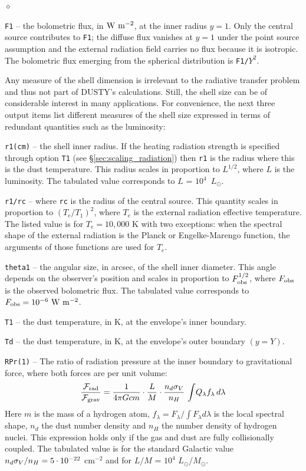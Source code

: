 \documentclass[11pt]{article}
\def\D    {{\sf DUSTY}}
\def\E#1{\hbox{$10^{#1}$}}
\def\eq#1{\begin{equation} #1 \end{equation}}
\def\Mo     {\hbox{$M_{\odot}$}}
\def\Lo     {\hbox{$L_{\odot}$}}
\def\sub#1{_{\rm #1}}
\def\Frad {\hbox{${\cal F}\sub{rad}$}}
\def\Fgrav{\hbox{${\cal F}\sub{grav}$}}
\begin{document}
\begin{list}{$\diamond$}{}
\item {\tt F1} -- the bolometric flux, in $\rm W\ m^{-2}$, at the inner radius
    $y = 1$. Only the central source contributes to {\tt F1}; the diffuse flux
    vanishes at $y = 1$ under the point source assumption and the external
    radiation field carries no flux because it is isotropic. The bolometric
    flux emerging from the spherical distribution is {\tt F1/$Y^2$}.

  Any measure of the shell dimension is irrelevant to the radiative
  transfer problem and thus not part of \D's calculations.  Still, the
  shell size can be of considerable interest in many applications. For
  convenience, the next three output items list different measures of
  the shell size expressed in terms of redundant quantities such as
  the luminosity:

\item {\tt r1(cm)} -- the shell inner radius. If the heating radiation
    strength is specified through option {\tt T1} (see
    \S\ref{sec:scaling_radiation}) then {\tt r1} is the radius where this is
    the dust temperature. This radius scales in proportion to $L^{1/2}$, where
    $L$ is the luminosity. The tabulated value corresponds to $L$ = \E4~\Lo.

\item {\tt r1/rc} -- where {\tt rc} is the radius of the central
  source.  This quantity scales in proportion to $(T_e/T_1)^2$, where
  $T_e$ is the external radiation effective temperature.  The listed
  value is for $T_e = 10,000$ K with two exceptions: when the spectral
  shape of the external radiation is the Planck or Engelke-Marengo
  function, the arguments of those functions are used for $T_e$.

\item {\tt theta1} -- the angular size, in arcsec, of the shell inner
  diameter.  This angle depends on the observer's position and scales
  in proportion to $F_{\rm obs}^{1/2}$, where $F_{\rm obs}$ is the
  observed bolometric flux.  The tabulated value corresponds to
  $F_{\rm obs} = \E{-6}\ \rm W\ m^{-2}$.

\item {\tt T1} -- the dust temperature, in K, at the envelope's
  inner boundary.

\item {\tt Td} -- the dust temperature, in K, at the envelope's
  outer boundary $(y = Y)$.

\item {\tt RPr(1)} -- The ratio of radiation pressure at the inner
  boundary to gravitational force, where both forces are per unit
  volume: \eq{ {\Frad\over\Fgrav} = {1\over4\pi Gcm} \cdot{L\over
      M}\cdot{n_d\sigma_V\over n_H}\, \int\!Q_\lambda
    f_\lambda\,d\lambda } Here $m$ is the mass of a hydrogen atom,
  $f_\lambda = F_\lambda/\int F_\lambda d\lambda$ is the local
  spectral shape, $n_d$ the dust number density and $n_H$ the number
  density of hydrogen nuclei.  This expression holds only if the gas
  and dust are fully collisionally coupled. The tabulated value is for
  the standard Galactic value $n_d\sigma_V/n_H = 5\cdot\E{-22}$
  cm$^{-2}$ and for $L/M$ = \E4 \Lo/\Mo.


\end{list}
\end{document}
